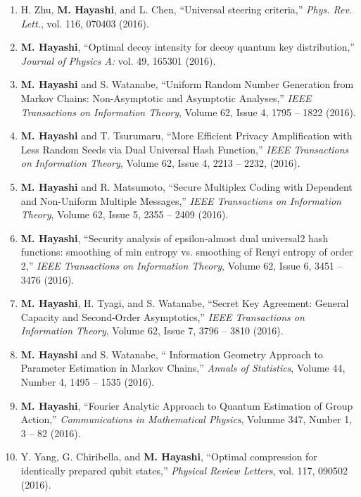 \documentclass[a4paper,12pt,oneside]{article}
\begin{document}
\begin{enumerate}
\item 
H. Zhu, \textbf{M. Hayashi}, and L. Chen, ``Universal steering criteria,'' 
{\em Phys. Rev. Lett.}, vol. 116, 070403 (2016). 

\item 
\textbf{M. Hayashi}, 
``Optimal decoy intensity for decoy quantum key distribution,'' 
{\em Journal of Physics A:} vol. 49, 165301 (2016). 

\item 
\textbf{M. Hayashi} and S. Watanabe, ``Uniform Random Number Generation from Markov Chains: Non-Asymptotic and Asymptotic Analyses,'' 
{\em IEEE Transactions on Information Theory}, Volume 62, Issue 4, 1795 -- 1822 (2016). 

\item 
\textbf{M. Hayashi} and T. Tsurumaru, ``More Efficient Privacy Amplification with Less Random Seeds via Dual Universal Hash Function,'' 
{\em IEEE Transactions on Information Theory}, 
Volume 62, Issue 4, 2213 -- 2232, (2016). 

\item 
\textbf{M. Hayashi} and R. Matsumoto, ``Secure Multiplex Coding with Dependent and Non-Uniform Multiple Messages,'' 
{\em IEEE Transactions on Information Theory}, Volume 62, Issue 5, 2355 -- 2409 (2016). 

\item 
\textbf{M. Hayashi}, ``Security analysis of epsilon-almost dual universal2 hash functions: smoothing of min entropy vs. smoothing of Renyi entropy of order 2,'' 
{\em IEEE Transactions on Information Theory}, Volume 62, Issue 6, 3451 -- 3476 (2016). 

\item 
\textbf{M. Hayashi}, H. Tyagi, and S. Watanabe, ``Secret Key Agreement: General Capacity and Second-Order Asymptotics,'' 
{\em IEEE Transactions on Information Theory}, Volume 62, Issue 7, 3796 -- 3810 (2016). 

\item 
\textbf{M. Hayashi} and S. Watanabe, `` Information Geometry Approach to Parameter Estimation in Markov Chains,'' 
{\em Annals of Statistics}, Volume 44, Number 4, 1495 -- 1535 (2016). 

\item 
\textbf{M. Hayashi}, 
``Fourier Analytic Approach to Quantum Estimation of Group Action,'' 
{\em Communications in Mathematical Physics}, Volunme 347, Nunber 1, 3 -- 82 (2016). 

\item 
Y. Yang, G. Chiribella, and \textbf{M. Hayashi}, 
``Optimal compression for identically prepared qubit states,'' 
{\em Physical Review Letters}, vol. 117, 090502 (2016).


\end{enumerate}
\end{document}
